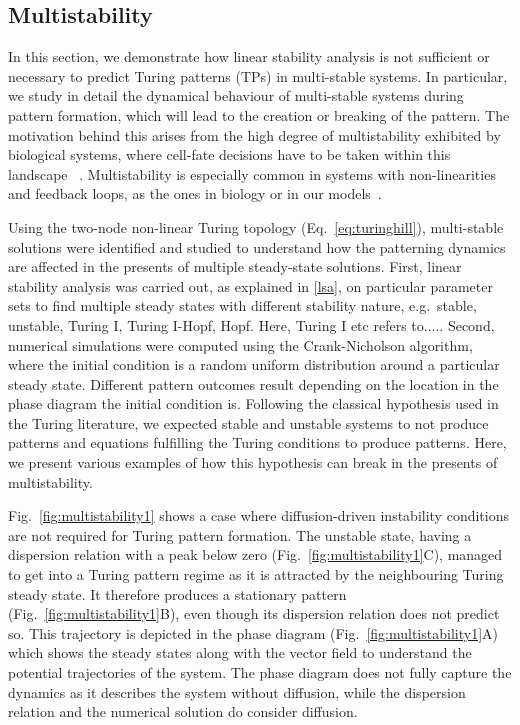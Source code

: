 \subsection{Multistability}
In this section, we demonstrate how linear stability analysis is not sufficient or necessary to predict Turing patterns (TPs) in multi-stable systems.
In particular, we study in detail the dynamical behaviour of multi-stable systems during pattern formation, which will lead to the creation or breaking of the pattern.
The motivation behind this arises from the high degree of multistability exhibited by biological systems, where cell-fate decisions have to be taken within this landscape ~\parencite{huang2000shape, moris2016transition}.
Multistability is especially common in systems with non-linearities and feedback loops, as the ones in biology or in our models~\parencite{pham2020complexity, leite2009multistability}.

Using the two-node non-linear Turing topology (Eq.~\ref{eq:turinghill}), multi-stable solutions were identified and studied to understand how the patterning dynamics are affected in the presents of multiple steady-state solutions.
First, linear stability analysis was carried out, as explained in \ref{lsa}, on particular parameter sets to find multiple steady states with different stability nature, e.g.~stable, unstable, Turing I, Turing I-Hopf, Hopf. Here, Turing I etc refers to.....
Second, numerical simulations were computed using the Crank-Nicholson algorithm, where the initial condition is a random uniform distribution around a particular steady state.
Different pattern outcomes result depending on the location in the phase diagram the initial condition is.
Following the classical hypothesis used in the Turing literature, we expected stable and unstable systems to not produce patterns and equations fulfilling the Turing conditions to produce patterns.
Here, we present various examples of how this hypothesis can break in the presents of multistability.

Fig.~\ref{fig:multistability1} shows a case where diffusion-driven instability conditions are not required for Turing pattern formation.
The unstable state, having a dispersion relation with a peak below zero (Fig.~\ref{fig:multistability1}C), managed to get into a Turing pattern regime as it is attracted by the neighbouring Turing steady state.
It therefore produces a stationary pattern (Fig.~\ref{fig:multistability1}B), even though its dispersion relation does not predict so.
This trajectory is depicted in the phase diagram (Fig.~\ref{fig:multistability1}A) which shows the steady states along with the vector field to understand the potential trajectories of the system.
The phase diagram does not fully capture the dynamics as it describes the system without diffusion, while the dispersion relation and the numerical solution do consider diffusion.

